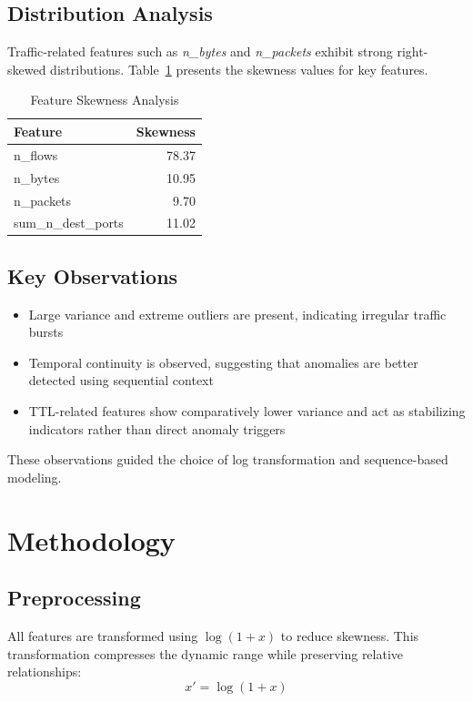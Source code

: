 \documentclass[conference]{IEEEtran}
\begin{document}
\subsection{Distribution Analysis}
Traffic-related features such as \textit{n\_bytes} and \textit{n\_packets} exhibit strong right-skewed distributions. Table~\ref{tab:skewness} presents the skewness values for key features.

\begin{table}[H]
\caption{Feature Skewness Analysis}
\centering
\begin{tabular}{|l|r|}
\hline
\textbf{Feature} & \textbf{Skewness} \\
\hline
n\_flows & 78.37 \\
n\_bytes & 10.95 \\
n\_packets & 9.70 \\
sum\_n\_dest\_ports & 11.02 \\
\hline
\end{tabular}
\label{tab:skewness}
\end{table}

\subsection{Key Observations}
\begin{itemize}
    \item Large variance and extreme outliers are present, indicating irregular traffic bursts
    \item Temporal continuity is observed, suggesting that anomalies are better detected using sequential context
    \item TTL-related features show comparatively lower variance and act as stabilizing indicators rather than direct anomaly triggers
\end{itemize}

These observations guided the choice of log transformation and sequence-based modeling.

\section{Methodology}

\subsection{Preprocessing}
All features are transformed using $\log(1 + x)$ to reduce skewness. This transformation compresses the dynamic range while preserving relative relationships:
\begin{equation}
x' = \log(1 + x)
\end{equation}
\end{document}
